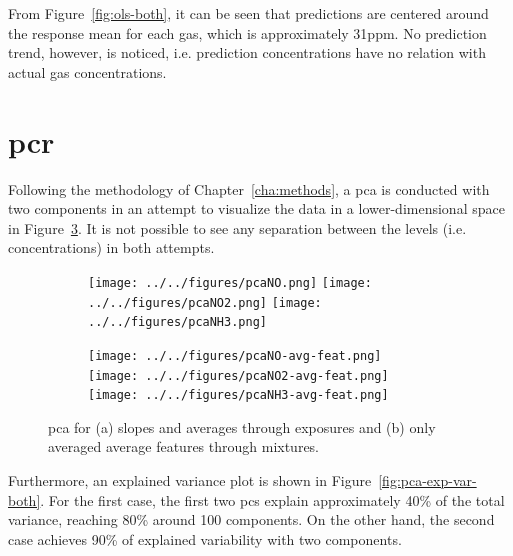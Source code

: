 From Figure~\ref{fig:ols-both}, it can be seen that predictions are centered around the response mean for each gas, which is approximately 31\acrshort{ppm}. No prediction trend, however, is noticed, i.e. prediction concentrations have no relation with actual gas concentrations.

\section{\acrlong{pcr}}
\label{sec:results-pcr}

Following the methodology of Chapter~\ref{cha:methods}, a \acrshort{pca} is conducted with two components in an attempt to visualize the data in a lower-dimensional space in Figure~\ref{fig:pca-both}.  It is not possible to see any separation between the levels (i.e. concentrations) in both attempts.

\begin{figure}[!htb]
	\centering
	
	\begin{subfigure}[b]{1\textwidth}
	\texttt{[image: ../../figures/pcaNO.png]}
	\hfill
	\texttt{[image: ../../figures/pcaNO2.png]}
	\hfill
	\texttt{[image: ../../figures/pcaNH3.png]}
	\caption{}
	\label{fig:pca}
	\end{subfigure}
	
	\begin{subfigure}[b]{1\textwidth}
	\texttt{[image: ../../figures/pcaNO-avg-feat.png]}
	\hfill
	\texttt{[image: ../../figures/pcaNO2-avg-feat.png]}
	\hfill
	\texttt{[image: ../../figures/pcaNH3-avg-feat.png]}
	\caption{}
	\label{fig:pca-avg-only}
	\end{subfigure}
	
	\caption{\acrshort{pca} for (a) slopes and averages through exposures and (b) only averaged average features through mixtures.}
	\label{fig:pca-both}
\end{figure}

Furthermore, an explained variance plot is shown in Figure~\ref{fig:pca-exp-var-both}. For the first case, the first two \acrshort{pc}s explain approximately 40\% of the total variance, reaching 80\% around 100 components. On the other hand, the second case achieves 90\% of explained variability with two components.

